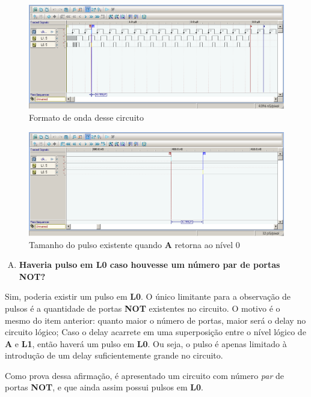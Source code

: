 \documentclass[12pt]{article}
\begin{document}
\begin{figure}[H]
    \centering
    \includegraphics[width=.9\textwidth]{Exp04/exp4_2.0_d_clk_wave_ao_voltar_para_zero.png}
    \caption{Formato de onda desse circuito}\label{fig:exp4_2.0_d_clk_wave_ao_voltar_para_zero.png}
\end{figure}

\begin{figure}[H]
    \centering
    \includegraphics[width=.9\textwidth]{Exp04/exp4_2.0_d_clk_wave_lenght_ao_voltar_para_zero.png}
    \caption{Tamanho do pulso existente quando \textbf{A} retorna ao nível 0}\label{fig:exp4_2.0_d_clk_wave_lenght_ao_voltar_para_zero.png}
\end{figure}

\begin{enumerate}[E)]
\item \textbf{Haveria pulso em L0 caso houvesse um número par de portas NOT?}
\end{enumerate}

Sim, poderia existir um pulso em \textbf{L0}. O único limitante para a observação
de pulsos é a quantidade de portas \textbf{NOT} existentes no circuito. O motivo
é o mesmo do item anterior: quanto maior o número de portas, maior será o delay
no circuito lógico; Caso o delay acarrete em uma superposição entre o nível
lógico de \textbf{A} e \textbf{L1}, então haverá um pulso em \textbf{L0}. Ou
seja, o pulso é apenas limitado à introdução de um delay suficientemente grande
no circuito.

Como prova dessa afirmação, é apresentado um circuito com número \emph{par} de
portas \textbf{NOT}, e que ainda assim possui pulsos em \textbf{L0}.
\end{document}
